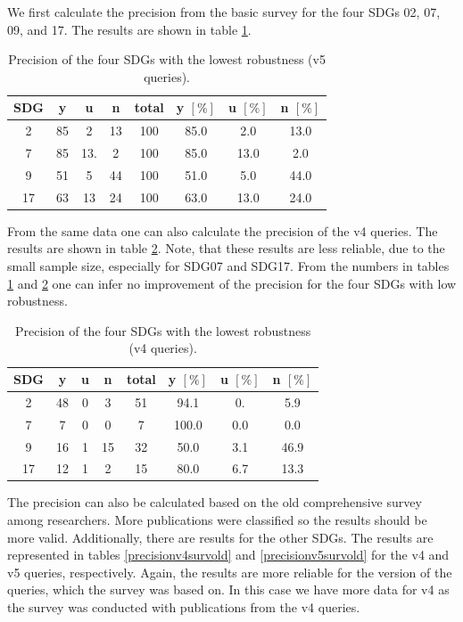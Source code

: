 \documentclass{article}
\begin{document}
We first calculate the precision from the basic survey for the four SDGs 02, 07, 09, and 17. The results are shown in table \ref{precisionv5surv}.
\begin{table}[H]
\centering 
 \begin{tabular}{cccccccc}
 \toprule
 SDG & y & u & n & total & y $[\%]$ & u $[\%]$ & n $[\%]$ \\
  \hline
2 & 85 & 2 & 13 & 100 & 85.0 & 2.0 & 13.0 \\
7 & 85 & 13. & 2 & 100 & 85.0 & 13.0 & 2.0 \\
9 & 51 & 5 & 44 & 100 & 51.0 & 5.0 & 44.0 \\
17 & 63 & 13 & 24 & 100 & 63.0& 13.0 & 24.0 \\
\bottomrule
\end{tabular}
\caption{Precision of the four SDGs with the lowest robustness (v5 queries).}\label{precisionv5surv}
\end{table}
From the same data one can also calculate the precision of the v4 queries. The results are shown in table \ref{precisionv4surv}. Note, that these results are less reliable, due to the small sample size, especially for SDG07 and SDG17. 
From the numbers in tables \ref{precisionv5surv} and \ref{precisionv4surv} one can infer no improvement of the precision for the four SDGs with low robustness.
\begin{table}[H]
\centering 
 \begin{tabular}{cccccccc}
 \toprule
  SDG & y & u & n & total & y $[\%]$ & u $[\%]$ & n $[\%]$ \\
  \hline
2& 48 & 0 & 3 & 51 & 94.1 & 0. & 5.9 \\
7 & 7 & 0 & 0 & 7 & 100.0 & 0.0 & 0.0 \\
9 & 16 & 1 & 15 & 32 & 50.0 & 3.1 & 46.9 \\
17 & 12 & 1 & 2 & 15 & 80.0 & 6.7 & 13.3 \\
\bottomrule
\end{tabular}\caption{Precision of the four SDGs with the lowest robustness (v4 queries).}\label{precisionv4surv}
\end{table}
The precision can also be calculated based on the old comprehensive survey among researchers. More publications were classified so the results should be more valid. Additionally, there are results for the other SDGs. The results are represented in tables  \ref{precisionv4survold} and \ref{precisionv5survold} for the v4 and v5 queries, respectively. Again, the results are more reliable for the version of the queries, which the survey was based on. In this case we have more data for v4 as the survey was conducted with publications from the v4 queries.
\end{document}
